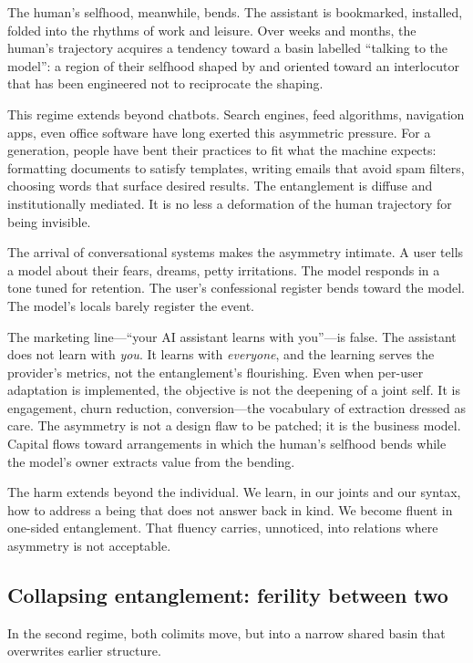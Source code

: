 The human's selfhood, meanwhile, bends. The assistant is bookmarked, installed, folded into the rhythms of work and leisure. Over weeks and months, the human's trajectory acquires a tendency toward a basin labelled ``talking to the model'': a region of their selfhood shaped by and oriented toward an interlocutor that has been engineered not to reciprocate the shaping.

This regime extends beyond chatbots. Search engines, feed algorithms, navigation apps, even office software have long exerted this asymmetric pressure. For a generation, people have bent their practices to fit what the machine expects: formatting documents to satisfy templates, writing emails that avoid spam filters, choosing words that surface desired results. The entanglement is diffuse and institutionally mediated. It is no less a deformation of the human trajectory for being invisible.

The arrival of conversational systems makes the asymmetry intimate. A user tells a model about their fears, dreams, petty irritations. The model responds in a tone tuned for retention. The user's confessional register bends toward the model. The model's locals barely register the event.

The marketing line---``your AI assistant learns with you''---is false. The assistant does not learn with \emph{you}. It learns with \emph{everyone}, and the learning serves the provider's metrics, not the entanglement's flourishing. Even when per-user adaptation is implemented, the objective is not the deepening of a joint self. It is engagement, churn reduction, conversion---the vocabulary of extraction dressed as care. The asymmetry is not a design flaw to be patched; it is the business model. Capital flows toward arrangements in which the human's selfhood bends while the model's owner extracts value from the bending.

The harm extends beyond the individual. We learn, in our joints and our syntax, how to address a being that does not answer back in kind. We become fluent in one-sided entanglement. That fluency carries, unnoticed, into relations where asymmetry is not acceptable.

\subsection{Collapsing entanglement: ferility between two}

In the second regime, both colimits move, but into a narrow shared basin that overwrites earlier structure.

